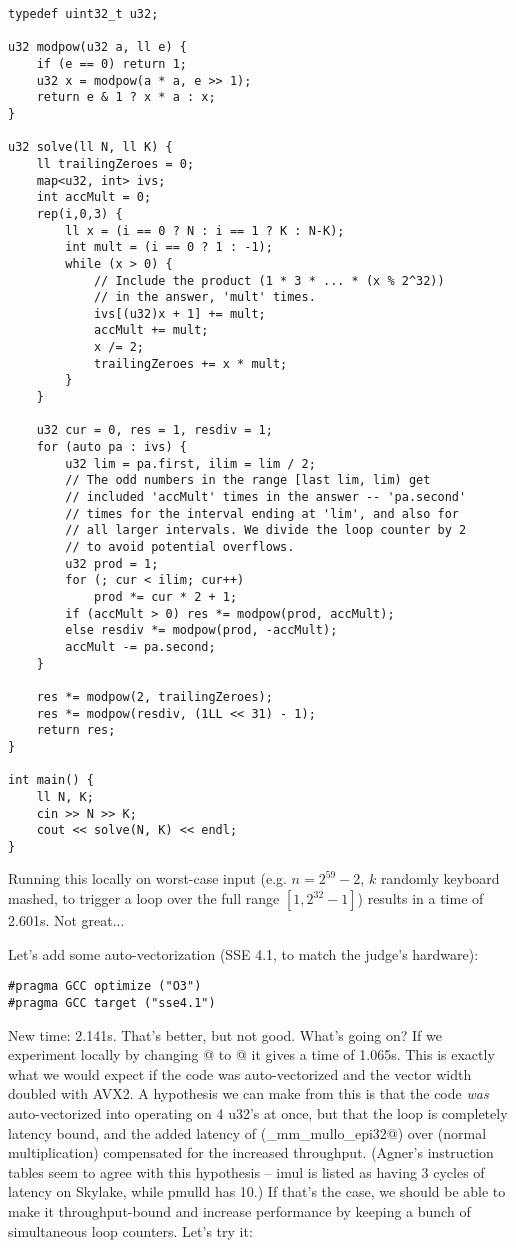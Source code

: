 \documentclass[openany]{book}
\begin{document}
\begin{lstlisting}
typedef uint32_t u32;

u32 modpow(u32 a, ll e) {
	if (e == 0) return 1;
	u32 x = modpow(a * a, e >> 1);
	return e & 1 ? x * a : x;
}

u32 solve(ll N, ll K) {
	ll trailingZeroes = 0;
	map<u32, int> ivs;
	int accMult = 0;
	rep(i,0,3) {
		ll x = (i == 0 ? N : i == 1 ? K : N-K);
		int mult = (i == 0 ? 1 : -1);
		while (x > 0) {
			// Include the product (1 * 3 * ... * (x % 2^32))
			// in the answer, 'mult' times.
			ivs[(u32)x + 1] += mult;
			accMult += mult;
			x /= 2;
			trailingZeroes += x * mult;
		}
	}

	u32 cur = 0, res = 1, resdiv = 1;
	for (auto pa : ivs) {
		u32 lim = pa.first, ilim = lim / 2;
		// The odd numbers in the range [last lim, lim) get
		// included 'accMult' times in the answer -- 'pa.second'
		// times for the interval ending at 'lim', and also for
		// all larger intervals. We divide the loop counter by 2
		// to avoid potential overflows.
		u32 prod = 1;
		for (; cur < ilim; cur++)
			prod *= cur * 2 + 1;
		if (accMult > 0) res *= modpow(prod, accMult);
		else resdiv *= modpow(prod, -accMult);
		accMult -= pa.second;
	}

	res *= modpow(2, trailingZeroes);
	res *= modpow(resdiv, (1LL << 31) - 1);
	return res;
}

int main() {
	ll N, K;
	cin >> N >> K;
	cout << solve(N, K) << endl;
}
\end{lstlisting}

Running this locally on worst-case input (e.g. $n = 2^{59}-2$, $k$ randomly keyboard mashed, to trigger a loop over the full range $[1, 2^{32}-1]$) results in a time of 2.601s. Not great...

Let's add some auto-vectorization (SSE 4.1, to match the judge's hardware):
\begin{lstlisting}
#pragma GCC optimize ("O3")
#pragma GCC target ("sse4.1")
\end{lstlisting}

New time: 2.141s. That's better, but not good. What's going on? If we experiment locally by changing @ to @ it gives a time of 1.065s. This is exactly what we would expect if the code was auto-vectorized and the vector width doubled with AVX2. A hypothesis we can make from this is that the code \emph{was} auto-vectorized into operating on 4 u32's at once, but that the loop is completely latency bound, and the added latency of \verb@pmulld@ (\verb@_mm_mullo_epi32@) over \verb@imul@ (normal multiplication) compensated for the increased throughput. (Agner's instruction tables seem to agree with this hypothesis -- imul is listed as having 3 cycles of latency on Skylake, while pmulld has 10.) If that's the case, we should be able to make it throughput-bound and increase performance by keeping a bunch of simultaneous loop counters. Let's try it:
\end{document}
